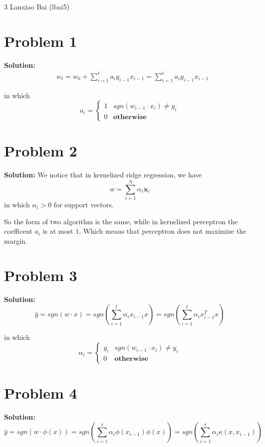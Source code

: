 \documentclass[11pt]{article}
\begin{document}
\homework
    {3}
    {Lanxiao Bai (lbai5)}
    {}

\section*{Problem 1}
\textbf{Solution:} 
	\begin{align}
		&w_t = w_0 + \sum_{i = 1}^t a_iy_{i - 1}x_{i - 1} = \sum_{i = 1}^t a_i y_{i - 1} x_{i - 1}\nonumber
	\end{align}
	
	in which 
	\[a_i = 
	\begin{cases}
		1 & sgn(w_{i - 1} \cdot x_{i}) \neq y_{i}\\
		0 & \textbf{otherwise}
	\end{cases} \]
\section*{Problem 2}
\textbf{Solution:} We notice that in kernelized ridge regression, we have
	\[w = \sum_{i = 1}^N \alpha_i \mathbf{x}_i\] in which $\alpha_i > 0$ for support vectors.
	
	So the form of two algorithm is the same, while in kernelized perceptron the coefficent $a_i$ is at most $1$. Which means that perceptron does not maximize the margin.
\section*{Problem 3}
\textbf{Solution:} 
\[\hat{y} = sgn(w\cdot x) = sgn(\sum_{i = 1}^t \alpha_i x_{i - 1}x) = sgn(\sum_{i = 1}^t \alpha_i x_{i - 1}^Tx)\]

in which
\[\alpha_i = 
	\begin{cases}
		y_i & sgn(w_{i - 1} \cdot x_{i}) \neq y_{i}\\
		0 & \textbf{otherwise}
	\end{cases} \]
\section*{Problem 4}
\textbf{Solution:} 
\[\hat{y} = sgn(w\cdot \phi(x)) = sgn(\sum_{i = 1}^t \alpha_i \phi(x_{i - 1})\phi(x)) = sgn(\sum_{i = 1}^t \alpha_i \kappa(x, x_{i - 1}))\]
\end{document}
